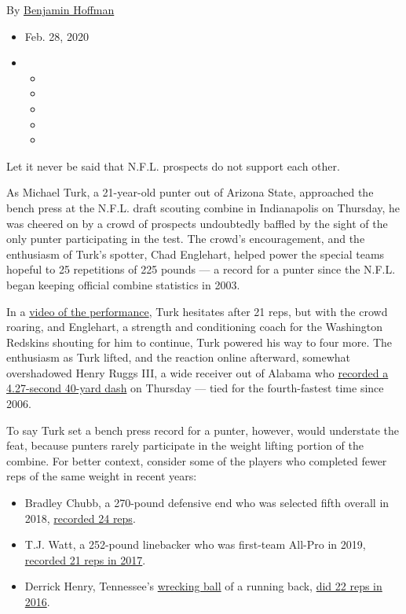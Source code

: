 By
\href{https://www.nytimes3xbfgragh.onion/by/benjamin-hoffman}{Benjamin
Hoffman}

\begin{itemize}
\item
  Feb. 28, 2020
\item
  \begin{itemize}
  \item
  \item
  \item
  \item
  \item
  \end{itemize}
\end{itemize}

Let it never be said that N.F.L. prospects do not support each other.

As Michael Turk, a 21-year-old punter out of Arizona State, approached
the bench press at the N.F.L. draft scouting combine in Indianapolis on
Thursday, he was cheered on by a crowd of prospects undoubtedly baffled
by the sight of the only punter participating in the test. The crowd's
encouragement, and the enthusiasm of Turk's spotter, Chad Englehart,
helped power the special teams hopeful to 25 repetitions of 225 pounds
--- a record for a punter since the N.F.L. began keeping official
combine statistics in 2003.

In a
\href{http://www.nfl.com/m/share?p=\%2Fvideos\%2Fnfl-combine\%2F0ap3000001103823\%2FPunter-Michael-Turk-puts-up-25-reps-on-bench-press}{video
of the performance}, Turk hesitates after 21 reps, but with the crowd
roaring, and Englehart, a strength and conditioning coach for the
Washington Redskins shouting for him to continue, Turk powered his way
to four more. The enthusiasm as Turk lifted, and the reaction online
afterward, somewhat overshadowed Henry Ruggs III, a wide receiver out of
Alabama who
\href{http://www.nfl.com/news/story/0ap3000001103981/article/henry-ruggs-clocks-428-unofficial-40yard-dash-at-nfl-combine}{recorded
a 4.27-second 40-yard dash} on Thursday --- tied for the fourth-fastest
time since 2006.

To say Turk set a bench press record for a punter, however, would
understate the feat, because punters rarely participate in the weight
lifting portion of the combine. For better context, consider some of the
players who completed fewer reps of the same weight in recent years:

\begin{itemize}
\item
  Bradley Chubb, a 270-pound defensive end who was selected fifth
  overall in 2018,
  \href{https://www.pro-football-reference.com/draft/2018-combine.htm}{recorded
  24 reps}.
\item
  T.J. Watt, a 252-pound linebacker who was first-team All-Pro in 2019,
  \href{https://www.pro-football-reference.com/draft/2017-combine.htm}{recorded
  21 reps in 2017}.
\item
  Derrick Henry, Tennessee's
  \href{https://www.nytimes3xbfgragh.onion/2020/01/16/sports/derrick-henry-titans-playoffs.html}{wrecking
  ball} of a running back,
  \href{https://www.pro-football-reference.com/draft/2016-combine.htm}{did
  22 reps in 2016}.
\end{itemize}

